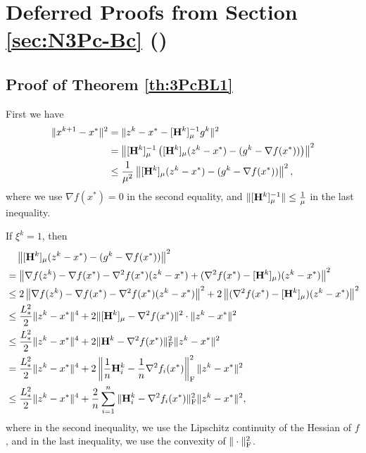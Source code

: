 \documentclass[11pt]{article}
\begin{document}
	
	\section{Deferred Proofs from Section \ref{sec:N3Pc-Bc} ()}
	
	
	\subsection{Proof of Theorem \ref{th:3PcBL1}}
	
	First we have 
	\begin{align}
		\|x^{k+1} - x^*\|^2 & = \|z^k - x^* - [\mathbf{H}^k]_\mu^{-1} g^k \|^2 \nonumber \\ 
		& = \left\| [\mathbf{H}^k]_\mu^{-1} \left(  [\mathbf{H}^k]_\mu (z^k - x^*) - (g^k - \nabla f(x^*))  \right)   \right\|^2 \nonumber \\ 
		& \leq \frac{1}{\mu^2} \left\|   [\mathbf{H}^k]_\mu (z^k - x^*) - (g^k - \nabla f(x^*))   \right\|^2, \label{eq:11-BL1}
	\end{align}
	where we use $\nabla f(x^*) = 0$ in the second equality, and $\|[\mathbf{H}^k]_\mu^{-1}\| \leq \frac{1}{\mu}$ in the last inequality. 
	
	If $\xi^k = 1$, then 
	\begin{align}
		& \quad \left\|   [\mathbf{H}^k]_\mu (z^k - x^*) - (g^k - \nabla f(x^*))   \right\|^2 \nonumber \\ 
		& = \left\|  \nabla f(z^k) - \nabla f(x^*) - \nabla^2 f(x^*) (z^k-x^*) + (\nabla^2 f(x^*) - [\mathbf{H}^k]_\mu) (z^k-x^*)  \right\|^2 \nonumber \\ 
		& \leq 2\left\|  \nabla f(z^k) - \nabla f(x^*) - \nabla^2 f(x^*) (z^k-x^*) \right\|^2  + 2\left\| (\nabla^2 f(x^*) - [\mathbf{H}^k]_\mu) (z^k-x^*)  \right\|^2 \nonumber \\ 
		& \leq \frac{L_{*}^2}{2} \|z^k - x^*\|^4 + 2\| [\mathbf{H}^k]_\mu - \nabla^2 f(x^*)\|^2 \cdot \|z^k-x^*\|^2 \nonumber \\ 
		& \leq \frac{L_{*}^2}{2} \|z^k - x^*\|^4 + 2\| \mathbf{H}^k - \nabla^2 f(x^*)\|_{\rm F}^2 \|z^k-x^*\|^2 \nonumber \\ 
		& = \frac{L_{*}^2}{2} \|z^k - x^*\|^4 + 2 \left\| \frac{1}{n} \mathbf{H}_i^k - \frac{1}{n} \nabla^2 f_i(x^*) \right\|^2_{\rm F} \|z^k - x^*\|^2 \nonumber \\
		& \leq \frac{L_{*}^2}{2} \|z^k - x^*\|^4 +  \frac{2}{n} \sum_{i=1}^n \| \mathbf{H}_i^k - \nabla^2 f_i(x^*) \|^2_{\rm F} \|z^k-x^*\|^2, \label{eq:22-BL1}
	\end{align}
	where in the second inequality, we use the Lipschitz continuity of the Hessian of $f$, and in the last inequality, we use the convexity of $\|\cdot\|^2_{\rm F}$. 
	
\end{document}
